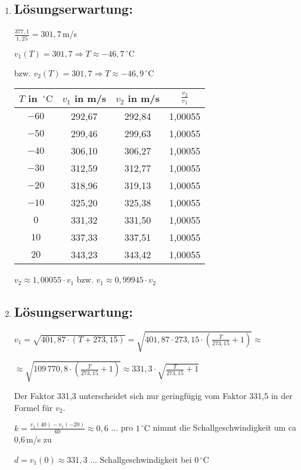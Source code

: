 \begin{langesbeispiel}
{\begin{enumerate}
mittlere Fallbeschleunigung: $a=\frac{377,1}{50}=7,54$\,m/s$²$
	
	\item \subsection{Lösungserwartung:}
	
	$\frac{377,1}{1,25}=301,7$\,m/s
	
	$v_1(T)=301,7 \Rightarrow T\approx -46,7\,^\circ\text{C}$
	
	bzw. $v_2(T)=301,7 \Rightarrow T\approx -46,9\,^\circ\text{C}$
	
	\begin{center}
		\begin{tabular}{|c|c|c|c|}\hline
		\cellcolor[gray]{0.9}$T$ in $\,^\circ\text{C}$&\cellcolor[gray]{0.9}$v_1$ in m/s&\cellcolor[gray]{0.9}$v_2$ in m/s&\cellcolor[gray]{0.9}$\frac{v_2}{v_1}$\\ \hline
		$-60$&292,67&292,84&1,00055\\ \hline
		$-50$&299,46&299,63&1,00055\\ \hline
		$-40$&306,10&306,27&1,00055\\ \hline
		$-30$&312,59&312,77&1,00055\\ \hline
		$-20$&318,96&319,13&1,00055\\ \hline
		$-10$&325,20&325,38&1,00055\\ \hline
		$0$&331,32&331,50&1,00055\\ \hline
		$10$&337,33&337,51&1,00055\\ \hline
		$20$&343,23&343,42&1,00055\\ \hline		
		\end{tabular}
	\end{center}
	
	$v_2\approx 1,00055\cdot v_1$ bzw. $v_1\approx 0,99945\cdot v_2$

\item \subsection{Lösungserwartung:}
	
$v_1=\sqrt{401,87\cdot (T+273,15)}=\sqrt{401,87\cdot 273,15\cdot(\frac{T}{273,15}+1)}\approx$

$\approx\sqrt{109\,770,8\cdot(\frac{T}{273,15}+1)}\approx 331,3\cdot\sqrt{\frac{T}{273,15}+1}$

Der Faktor 331,3 unterscheidet sich nur geringfügig vom Faktor 331,5 in der Formel für $v_2$.\leer

$k=\frac{v_1(40)-v_1(-20)}{60}\approx 0,6$ ... pro $1\,^\circ\text{C}$ nimmt die Schallgeschwindigkeit um ca 0,6\,m/s zu

$d=v_1(0)\approx 331,3$ ... Schallgeschwindigkeit bei $0\,^\circ\text{C}$
\end{enumerate}}
		\end{langesbeispiel}